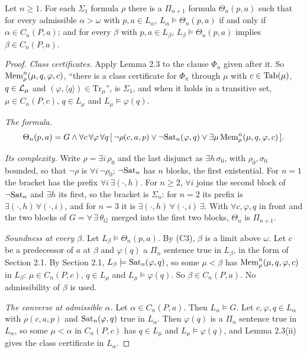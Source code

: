 \documentclass[11pt]{article}
\begin{document}
\begin{statement} Let $n \ge 1$. For each $\Sigma_1$ formula $\rho$ there is a $\Pi_{n+1}$ formula
$\Theta_n(p,a)$ such that for every admissible $\alpha > \omega$ with $p, a \in L_\alpha$, $L_\alpha \models
\Theta_n(p,a)$ if and only if $\alpha \in C_n(P,a)$; and for every $\beta$ with $p, a \in L_\beta$, $L_\beta \models
\Theta_n(p,a)$ implies $\beta \in C_n(P,a)$.
\end{statement}

\begin{proof}
\emph{Class certificates.} Apply Lemma 2.3 to the clause $\Phi_n$ given after it. So $\mathrm{Mem}^n_\rho(\mu, q, \varphi,
c)$, ``there is a class certificate for $\Phi_n$ through $\mu$ with $c \in \mathrm{Tab}(\mu)$, $q \in \mathcal{L}_\mu$ and $(\varphi,
\langle q\rangle) \in \mathrm{Tr}_\mu$'', is $\Sigma_1$, and when it holds in a transitive set, $\mu \in C_n(P,c)$, $q
\in L_\mu$ and $L_\mu \models \varphi(q)$.

\emph{The formula.}
\[ \Theta_n(p,a) = G \wedge \forall c\, \forall\varphi\, \forall q\, [\, \neg\rho(c,a,p) \vee \neg\mathrm{Sat}_n(\varphi,q) \vee
   \exists \mu\, \mathrm{Mem}^n_\rho(\mu, q, \varphi, c)\,]. \]

\emph{Its complexity.} Write $\rho = \exists i\, \rho_0$ and the last disjunct as $\exists h\, \sigma_0$, with
$\rho_0, \sigma_0$ bounded, so that $\neg\rho$ is $\forall i\, \neg\rho_0$; $\neg\mathrm{Sat}_n$ has $n$ blocks, the first
existential. For $n = 1$ the bracket has the prefix $\forall i\, \exists(\cdot, h)$. For $n \ge 2$, $\forall i$ joins the
second block of $\neg\mathrm{Sat}_n$ and $\exists h$ its first, so the bracket is $\Sigma_n$: for $n = 2$ its prefix is
$\exists (\cdot, h)\, \forall (\cdot, i)$, and for $n = 3$ it is $\exists (\cdot, h)\, \forall (\cdot, i)\, \exists$. With
$\forall c, \varphi, q$ in front and the two blocks of $G = \forall\, \exists\, \theta_G$ merged into the first two
blocks, $\Theta_n$ is $\Pi_{n+1}$.

\emph{Soundness at every $\beta$.} Let $L_\beta \models \Theta_n(p,a)$. By (C3), $\beta$ is a limit above $\omega$. Let
$c$ be a predecessor of $a$ at $\beta$ and $\varphi(q)$ a $\Pi_n$ sentence true in $L_\beta$, in the form of Section
2.1. By Section 2.1, $L_\beta \models \mathrm{Sat}_n(\varphi, q)$, so some $\mu < \beta$ has $\mathrm{Mem}^n_\rho(\mu,q,\varphi,c)$ in
$L_\beta$: $\mu \in C_n(P,c)$, $q \in L_\mu$ and $L_\mu \models \varphi(q)$. So $\beta \in C_n(P,a)$. No
admissibility of $\beta$ is used.

\emph{The converse at admissible $\alpha$.} Let $\alpha \in C_n(P,a)$. Then $L_\alpha \models G$. Let $c, \varphi, q \in
L_\alpha$ with $\rho(c,a,p)$ and $\mathrm{Sat}_n(\varphi,q)$ true in $L_\alpha$. Then $\varphi(q)$ is a $\Pi_n$ sentence true
in $L_\alpha$, so some $\mu < \alpha$ in $C_n(P,c)$ has $q \in L_\mu$ and $L_\mu \models \varphi(q)$, and Lemma 2.3(ii)
gives the class certificate in $L_\alpha$.
\end{proof}
\end{document}
